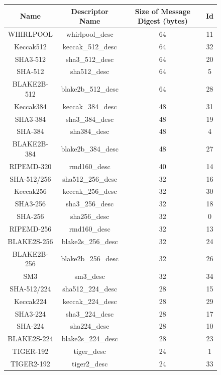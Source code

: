 \documentclass[synpaper]{book}
\begin{document}
\begin{figure}[H]
\begin{center}
\begin{tabular}{|c|c|c|c|}
      \hline \textbf{Name} & \textbf{Descriptor Name} & \textbf{Size of Message Digest (bytes)} & \textbf{Id} \\
      \hline WHIRLPOOL & whirlpool\_desc & 64 & 11 \\
      \hline Keccak512 & keccak\_512\_desc & 64 & 32 \\
      \hline SHA3-512 & sha3\_512\_desc & 64 & 20 \\
      \hline SHA-512 & sha512\_desc & 64 & 5 \\
      \hline BLAKE2B-512 & blake2b\_512\_desc & 64 & 28 \\
      \hline Keccak384 & keccak\_384\_desc & 48 & 31 \\
      \hline SHA3-384 & sha3\_384\_desc & 48 & 19 \\
      \hline SHA-384 & sha384\_desc & 48 & 4 \\
      \hline BLAKE2B-384 & blake2b\_384\_desc & 48 & 27 \\
      \hline RIPEMD-320 & rmd160\_desc & 40 & 14 \\
      \hline SHA-512/256 & sha512\_256\_desc & 32 & 16 \\
      \hline Keccak256 & keccak\_256\_desc & 32 & 30 \\
      \hline SHA3-256 & sha3\_256\_desc & 32 & 18 \\
      \hline SHA-256 & sha256\_desc & 32 & 0 \\
      \hline RIPEMD-256 & rmd160\_desc & 32 & 13 \\
      \hline BLAKE2S-256 & blake2s\_256\_desc & 32 & 24 \\
      \hline BLAKE2B-256 & blake2b\_256\_desc & 32 & 26 \\
      \hline SM3 & sm3\_desc & 32 & 34 \\
      \hline SHA-512/224 & sha512\_224\_desc & 28 & 15 \\
      \hline Keccak224 & keccak\_224\_desc & 28 & 29 \\
      \hline SHA3-224 & sha3\_224\_desc & 28 & 17 \\
      \hline SHA-224 & sha224\_desc & 28 & 10 \\
      \hline BLAKE2S-224 & blake2s\_224\_desc & 28 & 23 \\
      \hline TIGER-192 & tiger\_desc & 24 & 1 \\
      \hline TIGER2-192 & tiger2\_desc & 24 & 33 \\

\end{tabular}
\end{center}
\end{figure}
\end{document}
